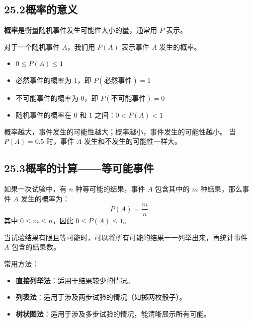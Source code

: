 \documentclass[12pt, a4paper]{ctexart}
\begin{document}
\subsection*{25.2\quad 概率的意义}

\begin{knowledgebox}[2. 概率的定义]
\textbf{概率}是衡量随机事件发生可能性大小的量，通常用 $P$ 表示。

\medskip
对于一个随机事件 $A$，我们用 $P(A)$ 表示事件 $A$ 发生的概率。
\begin{itemize}[leftmargin=2em]
  \item $0 \leqslant P(A) \leqslant 1$
  \item 必然事件的概率为 $1$，即 $P(\text{必然事件}) = 1$
  \item 不可能事件的概率为 $0$，即 $P(\text{不可能事件}) = 0$
  \item 随机事件的概率在 $0$ 和 $1$ 之间：$0 < P(A) < 1$
\end{itemize}
\end{knowledgebox}

\begin{tipbox}[规律总结]
概率越大，事件发生的可能性越大；概率越小，事件发生的可能性越小。
当 $P(A)=0.5$ 时，事件 $A$ 发生和不发生的可能性一样大。
\end{tipbox}

\subsection*{25.3\quad 概率的计算——等可能事件}

\begin{knowledgebox}[3. 等可能事件的概率公式]
如果一次试验中，有 $n$ 种等可能的结果，事件 $A$ 包含其中的 $m$ 种结果，那么事件 $A$ 发生的概率为：
\[
  P(A) = \frac{m}{n}
\]
其中 $0 \leqslant m \leqslant n$，因此 $0 \leqslant P(A) \leqslant 1$。
\end{knowledgebox}

\begin{knowledgebox}[4. 列举法求概率]
当试验结果有限且等可能时，可以将所有可能的结果一一列举出来，再统计事件 $A$ 包含的结果数。

\medskip
常用方法：
\begin{itemize}[leftmargin=2em]
  \item \textbf{直接列举法}：适用于结果较少的情况。
  \item \textbf{列表法}：适用于涉及两步试验的情况（如掷两枚骰子）。
  \item \textbf{树状图法}：适用于涉及多步试验的情况，能清晰展示所有可能。
\end{itemize}
\end{knowledgebox}
\end{document}
